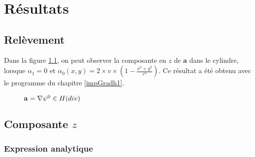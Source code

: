 \chapter{Résultats}

\section{Relèvement}
\label{respsih1}

Dans la figure \ref{az}, on peut observer la composante en $z$ de $\mathbf{a}$ dans le cylindre, lorsque $\alpha_1=0$ et $\alpha_0(x,y)=2\times v\times\left(1-\frac{x^2+y^2}{r^2}\right)$. Ce résultat a été obtenu avec le programme du chapitre \ref{impGradh1}. 

\begin{figure}[H]
\makebox[\textwidth][c]{
  \subfloat{\texttt{[image: az]}}\ 
  \subfloat{\texttt{[image: az1]}}
}
\caption{$\mathbf{a}={\nabla}\psi^0\in H(div)$}
\label{az}
\end{figure}

\section{Composante $z$}

\subsection{Expression analytique}

